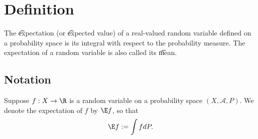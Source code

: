 
\section*{Definition}

The \t{expectation} (or \t{expected value}) of a real-valued random variable defined on a probability space is its integral with respect to the probability measure.
The expectation of a random variable is also called its \t{mean}.

\subsection*{Notation}

Suppose $f: X \to \R $ is a random variable on a probability space $(X, \mathcal{A} , P)$.
We denote the expectation of $f$ by $\E f$, so that
\[
\E  f := \int  f dP.
\]

\blankpage